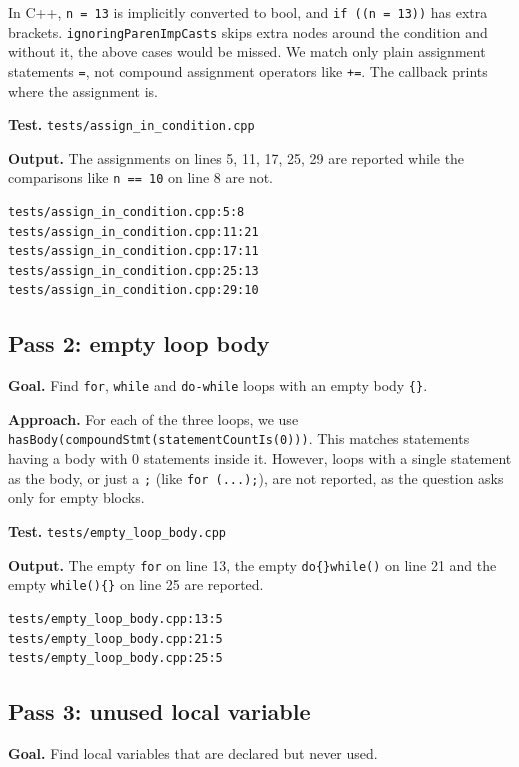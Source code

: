 \documentclass[11pt,a4paper]{article}
\begin{document}
In C++, \texttt{n = 13} is implicitly converted to bool, and \texttt{if ((n = 13))} has extra brackets. \texttt{ignoringParenImpCasts} skips extra nodes around the condition and without it, the above cases would be missed. We match only plain assignment statements \texttt{=}, not compound assignment operators like \texttt{+=}. The callback prints where the assignment is.

\textbf{Test.} \texttt{tests/assign\_in\_condition.cpp}

\textbf{Output.} The assignments on lines 5, 11, 17, 25, 29 are reported while the comparisons like \texttt{n == 10} on line 8 are not.

\begin{Verbatim}[fontsize=\footnotesize,frame=single,breaklines=true]
tests/assign_in_condition.cpp:5:8
tests/assign_in_condition.cpp:11:21
tests/assign_in_condition.cpp:17:11
tests/assign_in_condition.cpp:25:13
tests/assign_in_condition.cpp:29:10
\end{Verbatim}

\subsection{Pass 2: empty loop body}
\textbf{Goal.} Find \texttt{for}, \texttt{while} and \texttt{do-while} loops with an empty body \texttt{\{\}}.

\textbf{Approach.} For each of the three loops, we use \texttt{hasBody(compoundStmt(statementCountIs(0)))}. This matches statements having a body with 0 statements inside it. However, loops with a single statement as the body, or just a \texttt{;} (like \texttt{for (...);}), are not reported, as the question asks only for empty blocks.

\textbf{Test.} \texttt{tests/empty\_loop\_body.cpp}

\textbf{Output.} The empty \texttt{for} on line 13, the empty \texttt{do\{\}while()} on line 21 and the empty \texttt{while()\{\}} on line 25 are reported.

\begin{Verbatim}[fontsize=\footnotesize,frame=single,breaklines=true]
tests/empty_loop_body.cpp:13:5
tests/empty_loop_body.cpp:21:5
tests/empty_loop_body.cpp:25:5
\end{Verbatim}

\subsection{Pass 3: unused local variable}
\textbf{Goal.} Find local variables that are declared but never used.
\end{document}
